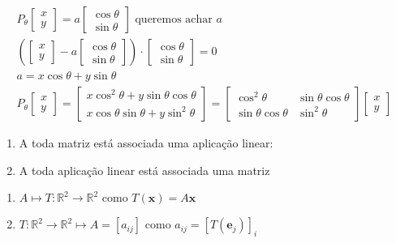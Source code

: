 \documentclass{beamer}
\begin{document}
\begin{frame}
  \begin{gather*}
    P_\theta\begin{bmatrix}
      x \\ y
    \end{bmatrix}= a\begin{bmatrix}
      \cos\theta \\ \sin\theta
    \end{bmatrix} \text{ queremos achar }a \\
    \left(\begin{bmatrix}
      x \\ y
    \end{bmatrix} - a\begin{bmatrix}
      \cos\theta \\ \sin\theta
    \end{bmatrix}\right) \cdot \begin{bmatrix}
      \cos\theta \\ \sin\theta
    \end{bmatrix} = 0 \\
    a = x\cos\theta + y\sin\theta \\
    P_\theta\begin{bmatrix}
      x \\ y 
    \end{bmatrix} = \begin{bmatrix}
      x\cos^2\theta + y\sin\theta\cos\theta \\
      x\cos\theta\sin\theta +y\sin^2\theta
    \end{bmatrix} = \begin{bmatrix}
      \cos^2\theta & \sin\theta\cos\theta \\
      \sin\theta\cos\theta & \sin^2\theta
    \end{bmatrix}\begin{bmatrix}
      x \\ y
    \end{bmatrix}
  \end{gather*}
\end{frame}

\begin{frame}
  \begin{enumerate}
    \item A toda matriz está associada uma aplicação linear:
    \item A toda aplicação linear está associada uma matriz
  \end{enumerate}
  \begin{enumerate}
    \item $ A \mapsto T:\mathbb{R}^2 \to \mathbb{R}^2 \text{ como } T(\mathbf{x})=A\mathbf{x}$
    \item $ T:\mathbb{R}^2 \to \mathbb{R}^2 \mapsto A = [a_{ij}] \text{ como } a_{ij} = [T(\mathbf{e}_j)]_i$
  \end{enumerate}
\end{frame}
\end{document}

